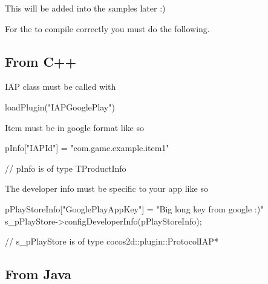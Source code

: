 This will be added into the samples later \+:)

For the to compile correctly you must do the following.

\subsection*{From C++}


\begin{DoxyEnumerate}
\item I\+AP class must be called with
\end{DoxyEnumerate}


\begin{DoxyCode}
loadPlugin(\textcolor{stringliteral}{"IAPGooglePlay"})
\end{DoxyCode}

\begin{DoxyEnumerate}
\item Item must be in google format like so 
\begin{DoxyCode}
pInfo[\textcolor{stringliteral}{"IAPId"}] = \textcolor{stringliteral}{"com.game.example.item1"} 

\textcolor{comment}{// pInfo is of type TProductInfo}
\end{DoxyCode}

\item The developer info must be specific to your app like so 
\begin{DoxyCode}
pPlayStoreInfo[\textcolor{stringliteral}{"GooglePlayAppKey"}] = \textcolor{stringliteral}{"Big long key from google :)"}
s\_pPlayStore->configDeveloperInfo(pPlayStoreInfo);

\textcolor{comment}{// s\_pPlayStore is of type cocos2d::plugin::ProtocolIAP*}
\end{DoxyCode}

\end{DoxyEnumerate}

\subsection*{From Java}


